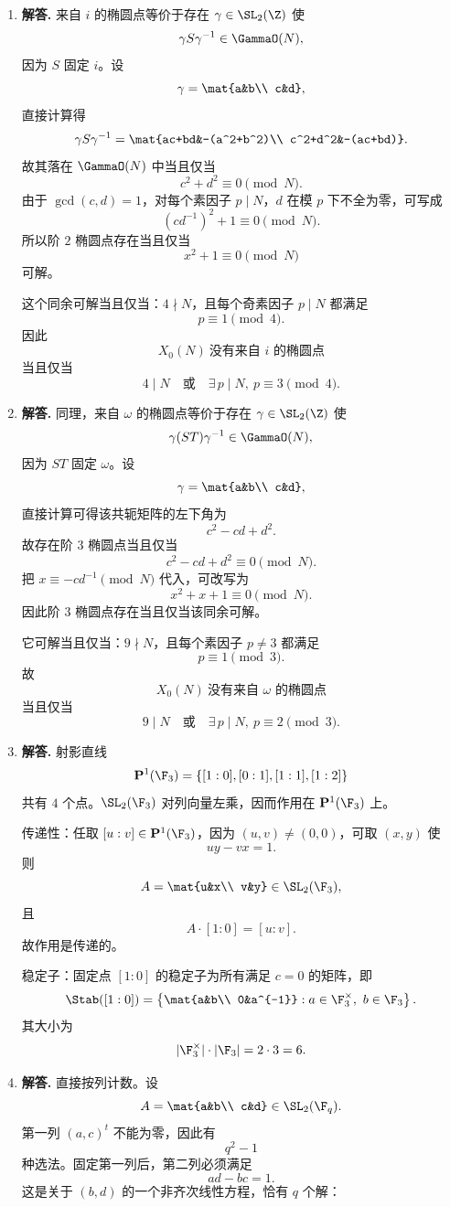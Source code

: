 \begin{enumerate}[label=\textbf{\arabic*.}, leftmargin=*, itemsep=1em]
\item \textbf{解答.} 来自 $i$ 的椭圆点等价于存在 $\gamma\in\SL_2(\Z)$ 使
\[
\gamma S\gamma^{-1}\in \GammaO(N),
\]
因为 $S$ 固定 $i$。设
\[
\gamma=\mat{a&b\\ c&d},
\]
直接计算得
\[
\gamma S\gamma^{-1}
=\mat{ac+bd&-(a^2+b^2)\\ c^2+d^2&-(ac+bd)}.
\]
故其落在 $\GammaO(N)$ 中当且仅当
\[
c^2+d^2\equiv 0\pmod N.
\]
由于 $\gcd(c,d)=1$，对每个素因子 $p\mid N$，$d$ 在模 $p$ 下不全为零，可写成
\[
\left(c d^{-1}\right)^2+1\equiv 0\pmod N.
\]
所以阶 $2$ 椭圆点存在当且仅当
\[
x^2+1\equiv 0\pmod N
\]
可解。

这个同余可解当且仅当：$4\nmid N$，且每个奇素因子 $p\mid N$ 都满足
\[
p\equiv 1\pmod 4.
\]
因此
\[
X_0(N)\ \text{没有来自 }i\text{ 的椭圆点}
\]
当且仅当
\[
4\mid N\quad\text{或}\quad \exists\,p\mid N,\ p\equiv 3\pmod 4.
\]

\item \textbf{解答.} 同理，来自 $\omega$ 的椭圆点等价于存在 $\gamma\in\SL_2(\Z)$ 使
\[
\gamma(ST)\gamma^{-1}\in \GammaO(N),
\]
因为 $ST$ 固定 $\omega$。设
\[
\gamma=\mat{a&b\\ c&d},
\]
直接计算可得该共轭矩阵的左下角为
\[
c^2-cd+d^2.
\]
故存在阶 $3$ 椭圆点当且仅当
\[
c^2-cd+d^2\equiv 0\pmod N.
\]
把 $x\equiv -cd^{-1}\pmod N$ 代入，可改写为
\[
x^2+x+1\equiv 0\pmod N.
\]
因此阶 $3$ 椭圆点存在当且仅当该同余可解。

它可解当且仅当：$9\nmid N$，且每个素因子 $p\neq 3$ 都满足
\[
p\equiv 1\pmod 3.
\]
故
\[
X_0(N)\ \text{没有来自 }\omega\text{ 的椭圆点}
\]
当且仅当
\[
9\mid N\quad\text{或}\quad \exists\,p\mid N,\ p\equiv 2\pmod 3.
\]

\item \textbf{解答.} 射影直线
\[
\mathbf P^1(\F_3)=\{[1:0],[0:1],[1:1],[1:2]\}
\]
共有 $4$ 个点。$\SL_2(\F_3)$ 对列向量左乘，因而作用在 $\mathbf P^1(\F_3)$ 上。

传递性：任取 $[u:v]\in\mathbf P^1(\F_3)$，因为 $(u,v)\neq(0,0)$，可取 $(x,y)$ 使
\[
uy-vx=1.
\]
则
\[
A=\mat{u&x\\ v&y}\in\SL_2(\F_3),
\]
且
\[
A\cdot [1:0]=[u:v].
\]
故作用是传递的。

稳定子：固定点 $[1:0]$ 的稳定子为所有满足 $c=0$ 的矩阵，即
\[
\Stab([1:0])=
\left\{\mat{a&b\\ 0&a^{-1}}:a\in\F_3^\times,\ b\in\F_3\right\}.
\]
其大小为
\[
|\F_3^\times|\cdot |\F_3|=2\cdot 3=6.
\]

\item \textbf{解答.} 直接按列计数。设
\[
A=\mat{a&b\\ c&d}\in \SL_2(\F_q).
\]
第一列 $(a,c)^t$ 不能为零，因此有
\[
q^2-1
\]
种选法。固定第一列后，第二列必须满足
\[
ad-bc=1.
\]
这是关于 $(b,d)$ 的一个非齐次线性方程，恰有 $q$ 个解：


\end{enumerate}
